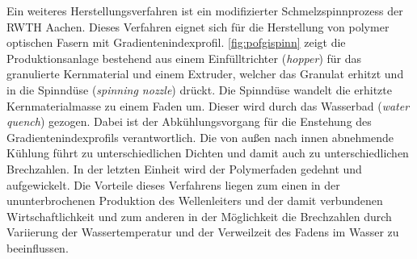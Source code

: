 Ein weiteres Herstellungsverfahren ist ein modifizierter Schmelzspinnprozess der
RWTH Aachen. Dieses Verfahren eignet sich für die Herstellung von polymer
optischen Fasern mit Gradientenindexprofil. \autoref{fig:pofgispinn} zeigt die
Produktionsanlage bestehend aus einem Einfülltrichter (\textit{hopper}) für das
granulierte Kernmaterial und einem Extruder, welcher das Granulat erhitzt und in
die Spinndüse (\textit{spinning nozzle}) drückt. Die Spinndüse wandelt die
erhitzte Kernmaterialmasse zu einem Faden um. Dieser wird durch das Wasserbad
(\textit{water quench}) gezogen. Dabei ist der Abkühlungsvorgang für die
Enstehung des Gradientenindexprofils verantwortlich. Die von außen nach innen
abnehmende Kühlung führt zu unterschiedlichen Dichten und damit auch zu
unterschiedlichen Brechzahlen. In der letzten Einheit wird der Polymerfaden
gedehnt und aufgewickelt. Die Vorteile dieses Verfahrens liegen zum einen in der
ununterbrochenen Produktion des Wellenleiters und der damit verbundenen
Wirtschaftlichkeit und zum anderen in der Möglichkeit die Brechzahlen durch
Variierung der Wassertemperatur und der Verweilzeit des Fadens im Wasser zu
beeinflussen. \cite{pofspinn}

